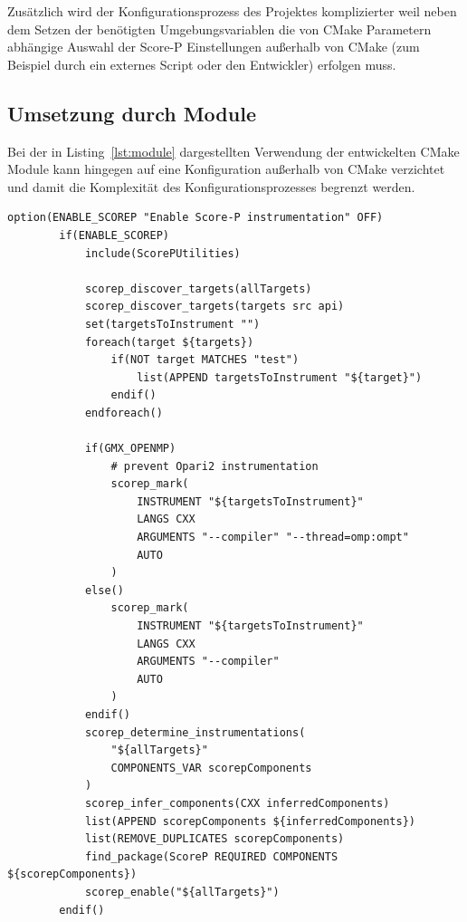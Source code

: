 \documentclass[german,proseminar,hyperref,utf8,lof]{zihpub}
\begin{document}
    Zusätzlich wird der Konfigurationsprozess des Projektes komplizierter weil neben dem Setzen der
    benötigten Umgebungsvariablen die von CMake Parametern abhängige Auswahl der Score-P Einstellungen
    au{\ss}erhalb von CMake (zum Beispiel durch ein externes Script oder den Entwickler) erfolgen muss.

    \subsection{Umsetzung durch Module}
    Bei der in Listing~\ref{lst:module} dargestellten Verwendung der entwickelten CMake Module kann
    hingegen auf eine Konfiguration au{\ss}erhalb von CMake verzichtet und damit die Komplexität
    des Konfigurationsprozesses begrenzt werden.

    \begin{lstlisting}[caption=Anwendung der entwickelten Module bei GROMACS, gobble=8, label=lst:module]
        option(ENABLE_SCOREP "Enable Score-P instrumentation" OFF)
        if(ENABLE_SCOREP)
            include(ScorePUtilities)
        
            scorep_discover_targets(allTargets)
            scorep_discover_targets(targets src api)
            set(targetsToInstrument "")
            foreach(target ${targets})
                if(NOT target MATCHES "test")
                    list(APPEND targetsToInstrument "${target}")
                endif()
            endforeach()
            
            if(GMX_OPENMP)
                # prevent Opari2 instrumentation
                scorep_mark(
                    INSTRUMENT "${targetsToInstrument}"
                    LANGS CXX
                    ARGUMENTS "--compiler" "--thread=omp:ompt"
                    AUTO
                )
            else()
                scorep_mark(
                    INSTRUMENT "${targetsToInstrument}"
                    LANGS CXX
                    ARGUMENTS "--compiler"
                    AUTO
                )
            endif()
            scorep_determine_instrumentations(
                "${allTargets}"
                COMPONENTS_VAR scorepComponents
            )
            scorep_infer_components(CXX inferredComponents)
            list(APPEND scorepComponents ${inferredComponents})
            list(REMOVE_DUPLICATES scorepComponents)
            find_package(ScoreP REQUIRED COMPONENTS ${scorepComponents})
            scorep_enable("${allTargets}")
        endif()
    \end{lstlisting}
\end{document}
